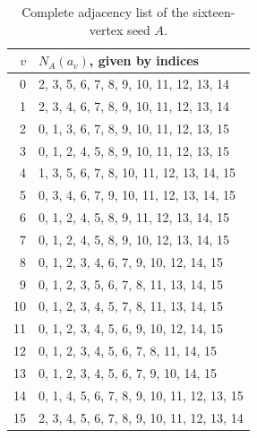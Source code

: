 \begin{table}[H]
\centering\small
\caption{Complete adjacency list of the sixteen-vertex seed \(A\).}
\label{4k4:tab:Aadj}
\begin{tabular}{r l}\toprule
\(v\)&\(N_A(a_v)\), given by indices\\\midrule
0 & 2, 3, 5, 6, 7, 8, 9, 10, 11, 12, 13, 14\\
1 & 2, 3, 4, 6, 7, 8, 9, 10, 11, 12, 13, 14\\
2 & 0, 1, 3, 6, 7, 8, 9, 10, 11, 12, 13, 15\\
3 & 0, 1, 2, 4, 5, 8, 9, 10, 11, 12, 13, 15\\
4 & 1, 3, 5, 6, 7, 8, 10, 11, 12, 13, 14, 15\\
5 & 0, 3, 4, 6, 7, 9, 10, 11, 12, 13, 14, 15\\
6 & 0, 1, 2, 4, 5, 8, 9, 11, 12, 13, 14, 15\\
7 & 0, 1, 2, 4, 5, 8, 9, 10, 12, 13, 14, 15\\
8 & 0, 1, 2, 3, 4, 6, 7, 9, 10, 12, 14, 15\\
9 & 0, 1, 2, 3, 5, 6, 7, 8, 11, 13, 14, 15\\
10 & 0, 1, 2, 3, 4, 5, 7, 8, 11, 13, 14, 15\\
11 & 0, 1, 2, 3, 4, 5, 6, 9, 10, 12, 14, 15\\
12 & 0, 1, 2, 3, 4, 5, 6, 7, 8, 11, 14, 15\\
13 & 0, 1, 2, 3, 4, 5, 6, 7, 9, 10, 14, 15\\
14 & 0, 1, 4, 5, 6, 7, 8, 9, 10, 11, 12, 13, 15\\
15 & 2, 3, 4, 5, 6, 7, 8, 9, 10, 11, 12, 13, 14\\
\bottomrule\end{tabular}
\end{table}
